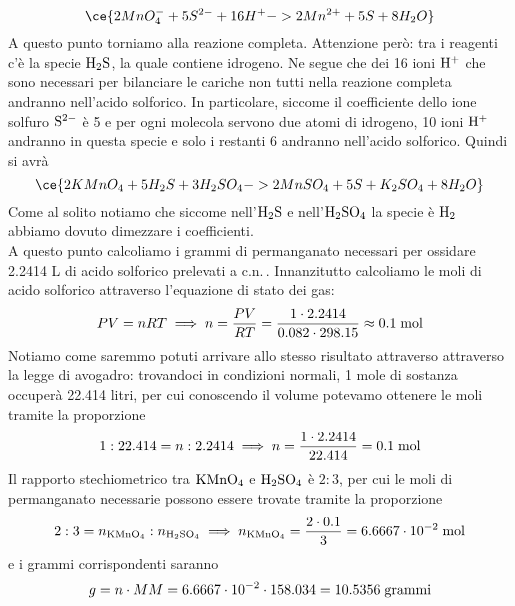 \begin{soluzione}
    \begin{equation*}
        \ce{2MnO_4^- + 5S^{2-} + 16H^+ -> 2Mn^{2+} + 5S + 8H_2O}
    \end{equation*}
    A questo punto torniamo alla reazione completa. Attenzione però: tra i reagenti c'è la specie $\rm H_2S$, la quale contiene idrogeno. Ne segue che dei 16 ioni $\rm H^+$ che sono necessari per bilanciare le cariche non tutti nella reazione completa andranno nell'acido solforico. In particolare, siccome il coefficiente dello ione solfuro $\rm S^{2-}$ è 5 e per ogni molecola servono due atomi di idrogeno, 10 ioni $\rm H^+$ andranno in questa specie e solo i restanti 6 andranno nell'acido solforico. Quindi si avrà
    \begin{equation*}
        \ce{2KMnO_4 + 5H_2S + 3H_2SO_4 -> 2MnSO_4 + 5S + K_2SO_4 + 8H_2O}
    \end{equation*}
    Come al solito notiamo che siccome nell'$\rm H_2S$ e nell'$\rm H_2SO_4$ la specie è $\rm H_2$ abbiamo dovuto dimezzare i coefficienti.\\
    A questo punto calcoliamo i grammi di permanganato necessari per ossidare 2.2414 L di acido solforico prelevati a c.n.\,. Innanzitutto calcoliamo le moli di acido solforico attraverso l'equazione di stato dei gas:
    \begin{equation*}
        PV=nRT
    \implies
    n=\frac{PV}{RT}
    =\frac{1 \cdot 2.2414}{0.082 \cdot 298.15}
    \approx 0.1 \; \rm mol
    \end{equation*}
    Notiamo come saremmo potuti arrivare allo stesso risultato attraverso attraverso la legge di avogadro: trovandoci in condizioni normali, 1 mole di sostanza occuperà 22.414 litri, per cui conoscendo il volume potevamo ottenere le moli tramite la proporzione
    \begin{equation*}
        1:22.414=n:2.2414
        \implies
        n=\frac{1 \cdot 2.2414}{22.414}=0.1 \; \rm mol
    \end{equation*}
    Il rapporto stechiometrico tra $\rm KMnO_4$ e $\rm H_2SO_4$ è $2:3$, per cui le moli di permanganato necessarie possono essere trovate tramite la proporzione
    \begin{equation*}
        2:3=n_{\rm KMnO_4}:n_{\rm H_2SO_4}
        \implies
        n_{\rm KMnO_4}=\frac{2 \cdot 0.1}{3}=6.6667 \cdot 10^{-2} \; \rm mol
    \end{equation*}
    e i grammi corrispondenti saranno
    \begin{equation*}
        g
        =n \cdot MM=6.6667 \cdot 10^{-2} \cdot 158.034
        =10.5356 \; \rm grammi
    \end{equation*}
\end{soluzione}

